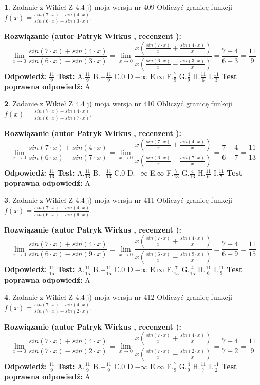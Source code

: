 \documentclass[12pt, a4paper]{article}
\theoremstyle{definition} %
\newtheorem{zad}{}
\newcommand{\zadStart}[1]{\begin{zad}#1\newline}
\newcommand{\zadStop}{\end{zad}}
\newcommand{\rozwStart}[2]{\noindent \textbf{Rozwiązanie (autor #1 , recenzent #2): }\newline}
\newcommand{\rozwStop}{\newline}
\newcommand{\odpStart}{\noindent \textbf{Odpowiedź:}\newline}
\newcommand{\odpStop}{\newline}
\newcommand{\testStart}{\noindent \textbf{Test:}\newline}
\newcommand{\testStop}{\newline}
\newcommand{\kluczStart}{\noindent \textbf{Test poprawna odpowiedź:}\newline}
\newcommand{\kluczStop}{\newline}
\begin{document}
\zadStart{Zadanie z Wikieł Z 4.4 j) moja wersja nr 409}
Obliczyć granicę funkcji $f(x)=\frac{sin(7\cdot x) +sin(4\cdot x)}{sin(6\cdot x) -sin(3\cdot x)}$.
\zadStop
\rozwStart{Patryk Wirkus}{}
$$\lim\limits_{x\to 0}\frac{sin(7\cdot x) +sin(4\cdot x)}{sin(6\cdot x) -sin(3\cdot x)}=\lim\limits_{x\to 0}\frac{x(\frac{sin(7\cdot x)}{x}+\frac{sin(4\cdot x)}{x})}{x(\frac{sin(6\cdot x)}{x}-\frac{sin(3\cdot x)}{x})}=\frac{7+4}{6+3} = \frac{11}{9}$$
\rozwStop
\odpStart
$\frac{11}{9}$
\odpStop
\testStart
A.$\frac{11}{9}$
B.$-\frac{11}{9}$
C.$0$
D.$-\infty$
E.$\infty$
F.$\frac{7}{9}$
G.$\frac{4}{9}$
H.$\frac{11}{6}$
I.$\frac{11}{3}$
\testStop
\kluczStart
A
\kluczStop



\zadStart{Zadanie z Wikieł Z 4.4 j) moja wersja nr 410}
Obliczyć granicę funkcji $f(x)=\frac{sin(7\cdot x) +sin(4\cdot x)}{sin(6\cdot x) -sin(7\cdot x)}$.
\zadStop
\rozwStart{Patryk Wirkus}{}
$$\lim\limits_{x\to 0}\frac{sin(7\cdot x) +sin(4\cdot x)}{sin(6\cdot x) -sin(7\cdot x)}=\lim\limits_{x\to 0}\frac{x(\frac{sin(7\cdot x)}{x}+\frac{sin(4\cdot x)}{x})}{x(\frac{sin(6\cdot x)}{x}-\frac{sin(7\cdot x)}{x})}=\frac{7+4}{6+7} = \frac{11}{13}$$
\rozwStop
\odpStart
$\frac{11}{13}$
\odpStop
\testStart
A.$\frac{11}{13}$
B.$-\frac{11}{13}$
C.$0$
D.$-\infty$
E.$\infty$
F.$\frac{7}{13}$
G.$\frac{4}{13}$
H.$\frac{11}{6}$
I.$\frac{11}{7}$
\testStop
\kluczStart
A
\kluczStop



\zadStart{Zadanie z Wikieł Z 4.4 j) moja wersja nr 411}
Obliczyć granicę funkcji $f(x)=\frac{sin(7\cdot x) +sin(4\cdot x)}{sin(6\cdot x) -sin(9\cdot x)}$.
\zadStop
\rozwStart{Patryk Wirkus}{}
$$\lim\limits_{x\to 0}\frac{sin(7\cdot x) +sin(4\cdot x)}{sin(6\cdot x) -sin(9\cdot x)}=\lim\limits_{x\to 0}\frac{x(\frac{sin(7\cdot x)}{x}+\frac{sin(4\cdot x)}{x})}{x(\frac{sin(6\cdot x)}{x}-\frac{sin(9\cdot x)}{x})}=\frac{7+4}{6+9} = \frac{11}{15}$$
\rozwStop
\odpStart
$\frac{11}{15}$
\odpStop
\testStart
A.$\frac{11}{15}$
B.$-\frac{11}{15}$
C.$0$
D.$-\infty$
E.$\infty$
F.$\frac{7}{15}$
G.$\frac{4}{15}$
H.$\frac{11}{6}$
I.$\frac{11}{9}$
\testStop
\kluczStart
A
\kluczStop



\zadStart{Zadanie z Wikieł Z 4.4 j) moja wersja nr 412}
Obliczyć granicę funkcji $f(x)=\frac{sin(7\cdot x) +sin(4\cdot x)}{sin(7\cdot x) -sin(2\cdot x)}$.
\zadStop
\rozwStart{Patryk Wirkus}{}
$$\lim\limits_{x\to 0}\frac{sin(7\cdot x) +sin(4\cdot x)}{sin(7\cdot x) -sin(2\cdot x)}=\lim\limits_{x\to 0}\frac{x(\frac{sin(7\cdot x)}{x}+\frac{sin(4\cdot x)}{x})}{x(\frac{sin(7\cdot x)}{x}-\frac{sin(2\cdot x)}{x})}=\frac{7+4}{7+2} = \frac{11}{9}$$
\rozwStop
\odpStart
$\frac{11}{9}$
\odpStop
\testStart
A.$\frac{11}{9}$
B.$-\frac{11}{9}$
C.$0$
D.$-\infty$
E.$\infty$
F.$\frac{7}{9}$
G.$\frac{4}{9}$
H.$\frac{11}{7}$
I.$\frac{11}{2}$
\testStop
\kluczStart
A
\kluczStop
\end{document}
